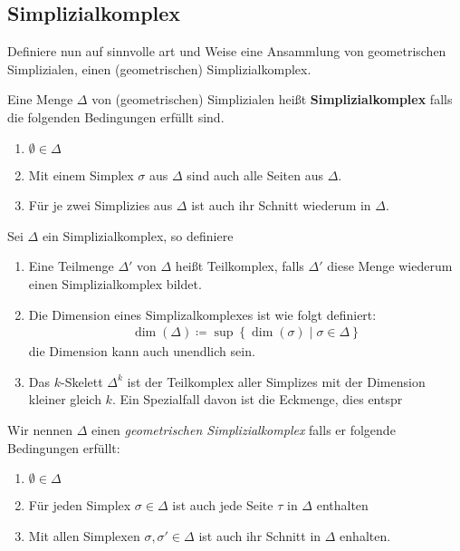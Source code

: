 \subsection{Simplizialkomplex}

Definiere nun auf sinnvolle art und Weise eine Ansammlung von
geometrischen Simplizialen, einen (geometrischen) Simplizialkomplex.

\begin{Def}
  Eine Menge $\Delta$ von (geometrischen) Simplizialen heißt
  \textbf{Simplizialkomplex} falls die folgenden Bedingungen erfüllt
  sind.
  \begin{enumerate}[1)]
  \item $\emptyset \in \Delta$
  \item Mit einem Simplex $\sigma$ aus $\Delta$ sind auch alle Seiten
    aus $\Delta$.
  \item Für je zwei Simplizies aus $\Delta$ ist auch ihr Schnitt
    wiederum in $\Delta$.
  \end{enumerate}
\end{Def}


\begin{Def}
  Sei $\Delta$ ein Simplizialkomplex, so definiere
  \begin{enumerate}[1)]
  \item Eine Teilmenge $\Delta'$ von $\Delta$ heißt Teilkomplex, falls
    $\Delta'$ diese Menge wiederum einen Simplizialkomplex bildet.
  \item Die Dimension eines Simplizalkomplexes ist wie folgt
    definiert:
    \begin{gather*}
      \dim(\Delta) \coloneqq \sup \left\{ \dim(\sigma) \; \Big| \;
        \sigma \in \Delta \right\}
    \end{gather*}
    die Dimension kann auch unendlich sein.
  \item Das $k$-Skelett $\Delta^k$ ist der Teilkomplex aller Simplizes
    mit der Dimension kleiner gleich $k$.  Ein Spezialfall davon ist
    die Eckmenge, dies entspr
  \end{enumerate}
\end{Def}


\begin{Def}
  Wir nennen $\Delta$ einen \textit{geometrischen Simplizialkomplex}
  falls er folgende Bedingungen erfüllt:
  \begin{enumerate}[(K1)]
  \item $\emptyset \in \Delta$
  \item Für jeden Simplex $\sigma \in \Delta$ ist auch jede Seite
    $\tau$ in $\Delta$ enthalten
  \item Mit allen Simplexen $\sigma, \sigma' \in \Delta$ ist auch ihr
    Schnitt in $\Delta$ enhalten.
  \end{enumerate}
\end{Def}




